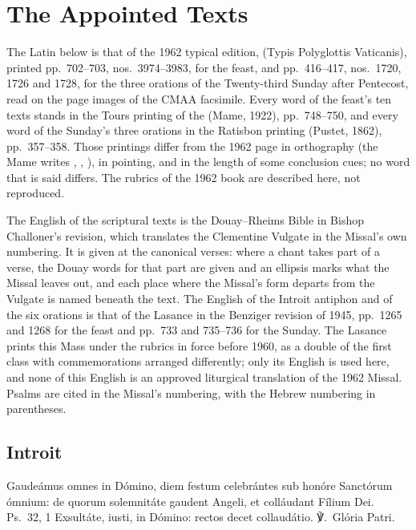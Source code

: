 \section{The Appointed Texts}
\label{sec:appointed-texts}

The Latin below is that of the 1962 typical edition, 
(Typis Polyglottis Vaticanis), printed pp.~702--703, nos.~3974--3983, for the
feast, and pp.~416--417, nos.~1720, 1726 and 1728, for the three orations of
the Twenty-third Sunday after Pentecost, read on the page images of the CMAA
facsimile. Every word of the feast's ten texts stands in the Tours printing of
the  (Mame, 1922), pp.~748--750, and every word of the
Sunday's three orations in the Ratisbon printing (Pustet, 1862),
pp.~357--358. Those printings differ from the 1962 page in orthography (the
Mame writes , , ), in pointing, and
in the length of some conclusion cues; no word that is said differs. The
rubrics of the 1962 book are described here, not reproduced.

The English of the scriptural texts is the Douay--Rheims Bible in Bishop
Challoner's revision, which translates the Clementine Vulgate in the Missal's
own numbering. It is given at the canonical verses: where a chant takes part
of a verse, the Douay words for that part are given and an ellipsis marks what
the Missal leaves out, and each place where the Missal's form departs from the
Vulgate is named beneath the text. The English of the Introit antiphon and of
the six orations is that of the Lasance  in the
Benziger revision of 1945, pp.~1265 and 1268 for the feast and pp.~733 and
735--736 for the Sunday. The Lasance prints this Mass under the rubrics in
force before 1960, as a double of the first class with commemorations
arranged differently; only its English is used here, and none of this English
is an approved liturgical translation of the 1962 Missal. Psalms are cited in
the Missal's numbering, with the Hebrew numbering in parentheses.

\subsection{Introit}
\label{proper-introit}


\begin{latinproper}
Gaudeámus omnes in Dómino, diem festum celebrántes sub honóre Sanctórum
ómnium: de quorum solemnitáte gaudent Angeli, et colláudant Fílium Dei.
\textnormal{Ps.\ 32, 1} Exsultáte, iusti, in Dómino: rectos decet collaudátio.
℣.~Glória Patri.
\end{latinproper}

